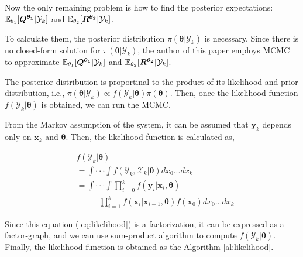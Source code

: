 Now the only remaining problem is how to find the posterior expectations: $\mathbb{E}_{\theta_1}[\bm {Q^{\theta_1}}|\mathcal{Y}_k]$ and $\mathbb{E}_{\theta_2}[\bm{R^{\theta_2}}|\mathcal{Y}_k]$.

To calculate them, the posterior distribution $\pi(\bm{\theta}|\mathcal{Y}_k)$ is necessary. Since there is no closed-form solution for $\pi(\bm{\theta}|\mathcal{Y}_k)$, the author of this paper employs MCMC to approximate $\mathbb{E}_{\theta_1}[\bm {Q^{\theta_1}}|\mathcal{Y}_k]$ and $\mathbb{E}_{\theta_2}[\bm{R^{\theta_2}}|\mathcal{Y}_k]$.

The posterior distribution is proportinal to the product of its likelihood and prior distribution, i.e., $\pi (\bm{\theta}|\mathcal{Y}_k) \propto f(\mathcal{Y}_k|\bm{\theta})\pi(\bm{\theta})$. Then, once the likelihood function $f(\mathcal{Y}_k|\bm{\theta})$ is obtained, we can run the MCMC.

From the Markov assumption of the system, it can be assumed that $\bm{y}_k$ depends only on $\bm{x}_k$ and $\bm{\theta}$. Then, the likelihood function is calculated as,

\begin{align} \label{eq:likelihood}
&f(\mathcal{Y}_k|\bm{\theta}) \nonumber\\
& = \int\cdot\cdot\cdot\int f(\mathcal{Y}_k, \mathcal{X}_k|\bm{\theta})dx_0...dx_k \nonumber\\
& = \int\cdot\cdot\cdot\int \prod^{k}_{i=0}f(\bm{y}_i| \bm{x}_i,\bm{\theta})\nonumber\\
&\;\;\;\;\;\;\;\;\;\;\prod^{k}_{i=1}f(\bm{x}_i|\bm{x}_{i-1}, \bm{\theta})f(\bm{x}_0)dx_0...dx_k
\end{align}

Since this equation (\ref{eq:likelihood}) is a factorization, it can be expressed as a factor-graph, and we can use sum-product algorithm\cite{Kschischang2001} to compute $f(\mathcal{Y}_k|\bm{\theta})$. Finally, the likelihood function is obtained as the Algorithm \ref{al:likelihood}.

